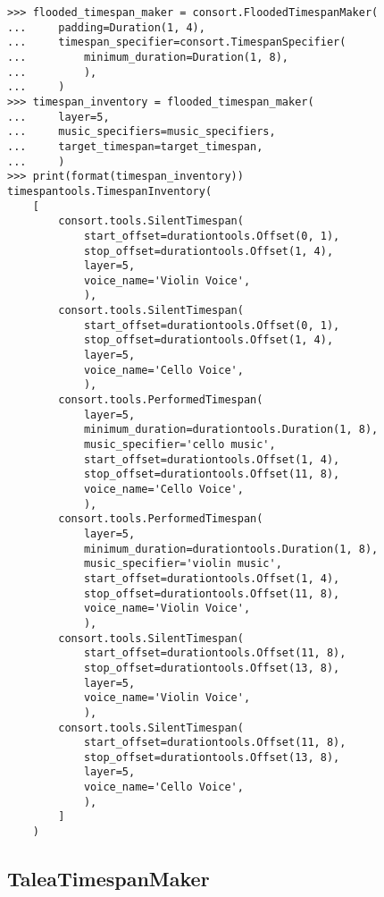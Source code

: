 \begin{singlespacing}
\vspace{-0.5\baselineskip}
\begin{lstlisting}
>>> flooded_timespan_maker = consort.FloodedTimespanMaker(
...     padding=Duration(1, 4),
...     timespan_specifier=consort.TimespanSpecifier(
...         minimum_duration=Duration(1, 8),
...         ),
...     )
>>> timespan_inventory = flooded_timespan_maker(
...     layer=5,
...     music_specifiers=music_specifiers,
...     target_timespan=target_timespan,
...     )
>>> print(format(timespan_inventory))
timespantools.TimespanInventory(
    [
        consort.tools.SilentTimespan(
            start_offset=durationtools.Offset(0, 1),
            stop_offset=durationtools.Offset(1, 4),
            layer=5,
            voice_name='Violin Voice',
            ),
        consort.tools.SilentTimespan(
            start_offset=durationtools.Offset(0, 1),
            stop_offset=durationtools.Offset(1, 4),
            layer=5,
            voice_name='Cello Voice',
            ),
        consort.tools.PerformedTimespan(
            layer=5,
            minimum_duration=durationtools.Duration(1, 8),
            music_specifier='cello music',
            start_offset=durationtools.Offset(1, 4),
            stop_offset=durationtools.Offset(11, 8),
            voice_name='Cello Voice',
            ),
        consort.tools.PerformedTimespan(
            layer=5,
            minimum_duration=durationtools.Duration(1, 8),
            music_specifier='violin music',
            start_offset=durationtools.Offset(1, 4),
            stop_offset=durationtools.Offset(11, 8),
            voice_name='Violin Voice',
            ),
        consort.tools.SilentTimespan(
            start_offset=durationtools.Offset(11, 8),
            stop_offset=durationtools.Offset(13, 8),
            layer=5,
            voice_name='Violin Voice',
            ),
        consort.tools.SilentTimespan(
            start_offset=durationtools.Offset(11, 8),
            stop_offset=durationtools.Offset(13, 8),
            layer=5,
            voice_name='Cello Voice',
            ),
        ]
    )
\end{lstlisting}
\end{singlespacing}

\subsection{TaleaTimespanMaker}

